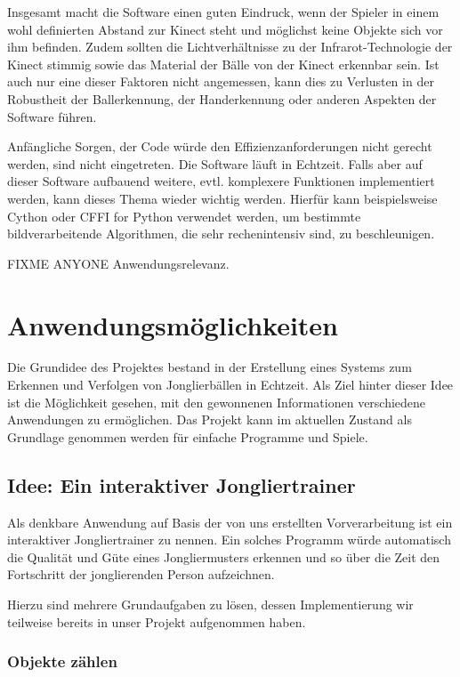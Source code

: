 \documentclass[12pt,a4paper,ngerman]{scrartcl}
\begin{document}
Insgesamt macht die Software einen guten Eindruck, wenn der Spieler in einem wohl definierten Abstand zur Kinect steht und möglichst keine Objekte sich vor ihm befinden. Zudem sollten die Lichtverhältnisse zu der Infrarot-Technologie der Kinect stimmig sowie das Material der Bälle von der Kinect erkennbar sein. Ist auch nur eine dieser Faktoren nicht angemessen, kann dies zu Verlusten in der Robustheit der Ballerkennung, der Handerkennung oder anderen Aspekten der Software führen.

Anfängliche Sorgen, der Code würde den Effizienzanforderungen nicht gerecht werden, sind nicht eingetreten. Die Software läuft in Echtzeit. Falls aber auf dieser Software aufbauend weitere, evtl. komplexere Funktionen implementiert werden, kann dieses Thema wieder wichtig werden. Hierfür kann beispielsweise Cython\cite{cython} oder CFFI for Python\cite{cffi} verwendet werden, um bestimmte bildverarbeitende Algorithmen, die sehr rechenintensiv sind, zu beschleunigen.

{\color{red}FIXME ANYONE Anwendungsrelevanz.}

\section{Anwendungsmöglichkeiten}

Die Grundidee des Projektes bestand in der Erstellung eines Systems zum Erkennen und
Verfolgen von Jonglierbällen in Echtzeit. Als Ziel hinter dieser Idee ist die
Möglichkeit gesehen, mit den gewonnenen Informationen verschiedene Anwendungen zu
ermöglichen. Das Projekt kann im aktuellen Zustand als Grundlage genommen werden
für einfache Programme und Spiele.

\subsection{Idee: Ein interaktiver Jongliertrainer}

Als denkbare Anwendung auf Basis der von uns erstellten Vorverarbeitung ist ein
interaktiver Jongliertrainer zu nennen. Ein solches Programm würde automatisch die
Qualität und Güte eines Jongliermusters erkennen und so über die Zeit den Fortschritt
der jonglierenden Person aufzeichnen.

Hierzu sind mehrere Grundaufgaben zu lösen, dessen Implementierung wir teilweise
bereits in unser Projekt aufgenommen haben.

\subsubsection{Objekte zählen}
\end{document}
